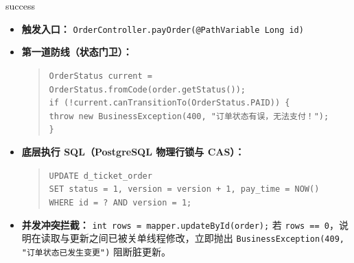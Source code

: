 \documentclass[a4paper,11pt]{ctexart}
\begin{document}
\vspace{0.2cm}


\begin{detailcard}{success}
\begin{itemize}[leftmargin=0.8cm, itemsep=3pt]
    \item \textbf{触发入口：} \texttt{OrderController.payOrder(@PathVariable Long id)}
    \item \textbf{第一道防线（状态门卫）：}
    \begin{quote}
        \footnotesize
        \texttt{OrderStatus current = OrderStatus.fromCode(order.getStatus());} \\
        \texttt{if (!current.canTransitionTo(OrderStatus.PAID)) \{} \\
        \quad \texttt{throw new BusinessException(400, "订单状态有误，无法支付！");} \\
        \texttt{\}}
    \end{quote}
    \item \textbf{底层执行 SQL（PostgreSQL 物理行锁与 CAS）：}
    \begin{quote}
        \footnotesize
        \texttt{UPDATE d\_ticket\_order} \\
        \texttt{SET status = 1, version = version + 1, pay\_time = NOW()} \\
        \texttt{WHERE id = ? AND version = 1;}
    \end{quote}
    \item \textbf{并发冲突拦截：} \texttt{int rows = mapper.updateById(order);} 若 \texttt{rows == 0}，说明在读取与更新之间已被关单线程修改，立即抛出 \texttt{BusinessException(409, "订单状态已发生变更")} 阻断脏更新。
\end{itemize}
\end{detailcard}

\vspace{0.2cm}
\end{document}
